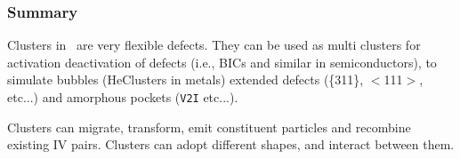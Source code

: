 \subsubsection{Summary}

Clusters in \MMonCa\ are very flexible defects. They can be used as multi clusters for activation deactivation of defects (i.e., BICs and similar in semiconductors), to simulate bubbles (HeClusters in metals) extended defects (\{311\}, $<$111$>$, etc...) and amorphous pockets (\verb+V2I+ etc...).

Clusters can migrate, transform, emit constituent particles and recombine existing IV pairs. Clusters can adopt different shapes, and interact between them.

